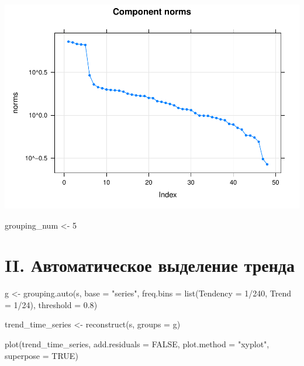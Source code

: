 \documentclass[
]{article}
\newenvironment{Shaded}{\begin{snugshade}}{\end{snugshade}}
\newcommand{\AttributeTok}[1]{\textcolor[rgb]{0.77,0.63,0.00}{#1}}
\newcommand{\ConstantTok}[1]{\textcolor[rgb]{0.00,0.00,0.00}{#1}}
\newcommand{\DecValTok}[1]{\textcolor[rgb]{0.00,0.00,0.81}{#1}}
\newcommand{\FloatTok}[1]{\textcolor[rgb]{0.00,0.00,0.81}{#1}}
\newcommand{\FunctionTok}[1]{\textcolor[rgb]{0.00,0.00,0.00}{#1}}
\newcommand{\NormalTok}[1]{#1}
\newcommand{\OtherTok}[1]{\textcolor[rgb]{0.56,0.35,0.01}{#1}}
\newcommand{\SpecialCharTok}[1]{\textcolor[rgb]{0.00,0.00,0.00}{#1}}
\newcommand{\StringTok}[1]{\textcolor[rgb]{0.31,0.60,0.02}{#1}}
\begin{document}
\includegraphics{eigen plot-1.pdf}

\begin{Shaded}
\begin{Highlighting}[]
\NormalTok{  grouping\_num }\OtherTok{\textless{}{-}} \DecValTok{5}
\end{Highlighting}
\end{Shaded}

\hypertarget{ii.-ux430ux432ux442ux43eux43cux430ux442ux438ux447ux435ux441ux43aux43eux435-ux432ux44bux434ux435ux43bux435ux43dux438ux435-ux442ux440ux435ux43dux434ux430}{%
\section{II. Автоматическое выделение
тренда}\label{ii.-ux430ux432ux442ux43eux43cux430ux442ux438ux447ux435ux441ux43aux43eux435-ux432ux44bux434ux435ux43bux435ux43dux438ux435-ux442ux440ux435ux43dux434ux430}}

\begin{Shaded}
\begin{Highlighting}[]
\NormalTok{  g }\OtherTok{\textless{}{-}} \FunctionTok{grouping.auto}\NormalTok{(s, }\AttributeTok{base =} \StringTok{"series"}\NormalTok{, }
                 \AttributeTok{freq.bins =} \FunctionTok{list}\NormalTok{(}\AttributeTok{Tendency =} \DecValTok{1}\SpecialCharTok{/}\DecValTok{240}\NormalTok{, }\AttributeTok{Trend =} \DecValTok{1}\SpecialCharTok{/}\DecValTok{24}\NormalTok{), }
                 \AttributeTok{threshold =} \FloatTok{0.8}\NormalTok{)}
                 
\NormalTok{  trend\_time\_series }\OtherTok{\textless{}{-}} \FunctionTok{reconstruct}\NormalTok{(s, }\AttributeTok{groups =}\NormalTok{ g)}
  
  \FunctionTok{plot}\NormalTok{(trend\_time\_series, }
   \AttributeTok{add.residuals =} \ConstantTok{FALSE}\NormalTok{, }
   \AttributeTok{plot.method =} \StringTok{"xyplot"}\NormalTok{, }\AttributeTok{superpose =} \ConstantTok{TRUE}\NormalTok{)}
\end{Highlighting}
\end{Shaded}
\end{document}
